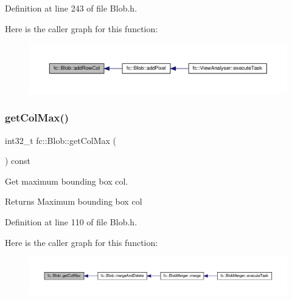 Definition at line 243 of file Blob.\+h.

Here is the caller graph for this function\+:
\nopagebreak
\begin{figure}[H]
\begin{center}
\leavevmode
\includegraphics[width=350pt]{d2/d7e/classfc_1_1Blob_a4c9d015ad9326b4f5688af7ae190e613_icgraph}
\end{center}
\end{figure}
\mbox{\label{classfc_1_1Blob_a1f9cfacc7e5d2f048c26f8b9c706141a}} 
\subsubsection{\texorpdfstring{get\+Col\+Max()}{getColMax()}}
{\footnotesize\ttfamily int32\+\_\+t fc\+::\+Blob\+::get\+Col\+Max (\begin{DoxyParamCaption}{ }\end{DoxyParamCaption}) const\hspace{0.3cm}{\ttfamily [inline]}}



Get maximum bounding box col. 

\begin{DoxyReturn}{Returns}
Maximum bounding box col 
\end{DoxyReturn}


Definition at line 110 of file Blob.\+h.

Here is the caller graph for this function\+:
\nopagebreak
\begin{figure}[H]
\begin{center}
\leavevmode
\includegraphics[width=350pt]{d2/d7e/classfc_1_1Blob_a1f9cfacc7e5d2f048c26f8b9c706141a_icgraph}
\end{center}
\end{figure}
\mbox{\label{classfc_1_1Blob_ac4e8548eb6f47c1febbd70184bee315a}} 
